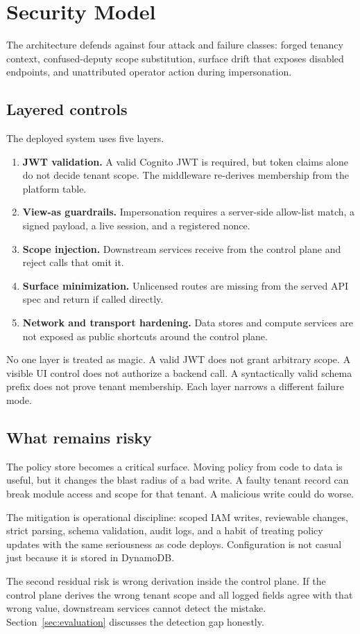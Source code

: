 \section{Security Model}
\label{sec:security}

The architecture defends against four attack and failure classes: forged tenancy context, confused-deputy scope substitution, surface drift that exposes disabled endpoints, and unattributed operator action during impersonation.

\subsection{Layered controls}

The deployed system uses five layers.

\begin{enumerate}
  \item \textbf{JWT validation.} A valid Cognito JWT is required, but token claims alone do not decide tenant scope. The middleware re-derives membership from the platform table.
  \item \textbf{View-as guardrails.} Impersonation requires a server-side allow-list match, a signed payload, a live session, and a registered nonce.
  \item \textbf{Scope injection.} Downstream services receive \scopeprefix{} from the control plane and reject calls that omit it.
  \item \textbf{Surface minimization.} Unlicensed routes are missing from the served API spec and return  if called directly.
  \item \textbf{Network and transport hardening.} Data stores and compute services are not exposed as public shortcuts around the control plane.
\end{enumerate}

No one layer is treated as magic. A valid JWT does not grant arbitrary scope. A visible UI control does not authorize a backend call. A syntactically valid schema prefix does not prove tenant membership. Each layer narrows a different failure mode.

\subsection{What remains risky}

The policy store becomes a critical surface. Moving policy from code to data is useful, but it changes the blast radius of a bad write. A faulty tenant record can break module access and scope for that tenant. A malicious write could do worse.

The mitigation is operational discipline: scoped IAM writes, reviewable changes, strict parsing, schema validation, audit logs, and a habit of treating policy updates with the same seriousness as code deploys. Configuration is not casual just because it is stored in DynamoDB.

The second residual risk is wrong derivation inside the control plane. If the control plane derives the wrong tenant scope and all logged fields agree with that wrong value, downstream services cannot detect the mistake. Section~\ref{sec:evaluation} discusses the detection gap honestly.
